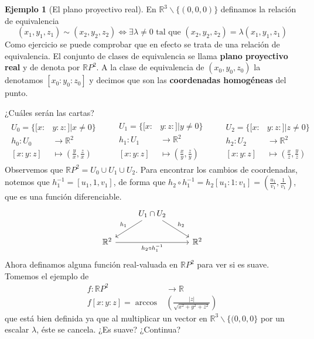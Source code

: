 \documentclass[spanish]{book}
\theoremstyle{definition}
\newtheorem*{ejem}{Ejemplo}
\newcommand{\R}{\mathbb{R}}
\begin{document}
\begin{ejem}[El plano proyectivo real]
	En $\R^3\backslash\{(0,0,0)\}$ definamos la relación de equivalencia
	\[(x_1,y_1,z_1)\sim(x_2,y_2,z_2)\iff\exists\lambda\neq0\text{ tal que }(x_2,y_2,z_2)=\lambda(x_1,y_1,z_1)\]
	Como ejercicio se puede comprobar que en efecto se trata de una relación de equivalencia. El conjunto de clases de equivalencia se llama \textbf{plano proyectivo real} y de denota por $\R P^2$. A la clase de equivalencia de $(x_0,y_0,z_0)$ la denotamos $[x_0:y_0:z_0]$ y decimos que son las \textbf{coordenadas homogéneas} del punto.
	
	¿Cuáles serán las cartas?
	\begin{align*}
		\begin{aligned}
			U_0=\{[x:&y:z:]|x\neq0\}\\
			h_0:U_0&\to\R^2\\
			[x:y:z]&\mapsto\left(\frac{y}{x},\frac{z}{x}\right)
		\end{aligned}\qquad
		\begin{aligned}
			U_1=\{[x:&y:z:]|y\neq0\}\\
			h_1:U_1&\to\R^2\\
			[x:y:z]&\mapsto\left(\frac{x}{y},\frac{z}{y}\right)
		\end{aligned}\qquad
		\begin{aligned}
			U_2=\{[x:&y:z:]|z\neq0\}\\
			h_2:U_2&\to\R^2\\
			[x:y:z]&\mapsto\left(\frac{x}{z},\frac{y}{z}\right)
		\end{aligned}
	\end{align*}
	Observemos que $\R P^2=U_0\cup U_1\cup U_2$. Para encontrar los cambios de coordenadas, notemos que $h_1^{-1}=[u_1,1,v_1]$, de forma que $h_2\circ h_1^{-1}=h_2[u_1:1:v_1]=\left(\frac{u_1}{v_1},\frac{1}{v_1}\right)$, que es una función diferenciable.
	\[\begin{tikzcd}
		&U_1\cap U_2\arrow[swap]{ld}{h_1}\arrow{rd}{h_2}\\
		\R^2\arrow[swap]{rr}{h_2\circ h_1^{-1}}&&\R^2
	\end{tikzcd}\]
	Ahora definamos alguna función real-valuada en $\R P^2$ para ver si es suave. Tomemos el ejemplo de
	\begin{align*}
		f:\R P^2&\to \R\\
		f[x:y:z]=\arccos&\left(\frac{|z|}{\sqrt{x^2+y^2+z^2}}\right)
	\end{align*}
	que está bien definida ya que al multiplicar un vector en $\R^3\backslash\{(0,0,0\}$ por un escalar $\lambda$, éste se cancela. ¿Es suave? ¿Continua?
	

\end{ejem}
\end{document}
